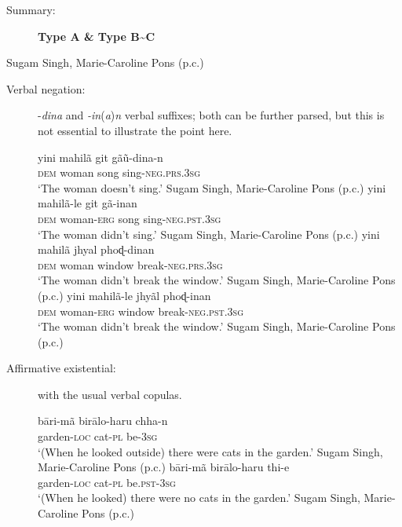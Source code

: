 \documentclass[output=paper,colorlinks,citecolor=brown]{langscibook}
\begin{document}
\begin{paperappendix}
\begin{unindented}
\begin{description}
\item[Summary:] \textbf{Type A \& Type B{\textasciitilde}C}
\end{description}

 Sugam Singh, Marie-Caroline Pons (p.c.)

\begin{description}
\item[Verbal negation:] -\textit{dina} and \textit{-in}(\textit{a})\textit{n} verbal suffixes; both can be further parsed, but this is not essential to illustrate the point here.

\begin{exe}\ex \gll yini mahilã git gãũ-dina-n \\
\textsc{dem}   woman song sing-\textsc{neg.prs.3sg} \\
    \glt `The woman doesn't sing.' Sugam Singh, Marie-Caroline Pons (p.c.)
\ex \gll yini mahilã-le git gã-inan \\
\textsc{dem} woman-\textsc{erg} song sing-\textsc{neg.pst.3sg} \\
    \glt `The woman didn't sing.' Sugam Singh, Marie-Caroline Pons (p.c.)
\ex \gll yini mahilã jhyal phoɖ-dinan \\
\textsc{dem} woman window break-\textsc{neg.prs.3sg} \\
    \glt `The woman didn't break the window.' Sugam Singh, Marie-Caroline Pons (p.c.)
\ex \gll yini mahilã-le jhyãl phoɖ-inan \\
\textsc{dem}   woman-\textsc{erg}  window break-\textsc{neg.pst.3sg} \\
    \glt `The woman didn't break the window.' Sugam Singh, Marie-Caroline Pons (p.c.)
\end{exe}

\item[Affirmative existential:] with the usual verbal copulas. 

\begin{exe}\ex \gll bāri-mã birālo-haru chha-n \\
garden-\textsc{loc} cat-\textsc{pl} be-\textsc{3sg} \\
    \glt `(When he looked outside) there were cats in the garden.' Sugam Singh, Marie-Caroline Pons (p.c.)
\ex \gll bāri-mã birālo-haru thi-e \\
garden-\textsc{loc} cat-\textsc{pl} be.\textsc{pst-3sg} \\
    \glt `(When he looked) there were no cats in the garden.' Sugam Singh, Marie-Caroline Pons (p.c.)
    \end{exe}


\end{description}
\end{unindented}
\end{paperappendix}
\end{document}
